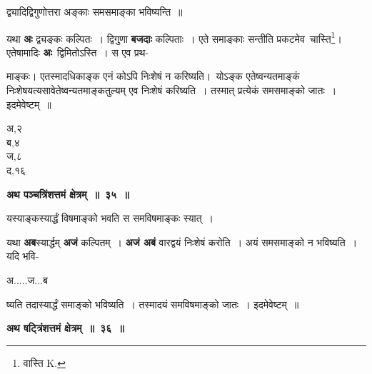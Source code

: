 \documentclass[11pt, openany]{book}
\begin{document}
 {\ab द्व्यादिद्विगुणोत्तरा अङ्काः समसमाङ्का भविष्यन्ति~॥ }

 यथा \textbf{अः} द्व्यङ्कः कल्पितः~। द्विगुणा \textbf{बजदाः} कल्पिताः~। एते  समाङ्काः सन्तीति प्रकटमेव \,चास्ति\renewcommand{\thefootnote}{१}\footnote{\hangindent=0.3in वास्ति {\en K.}}\;। एतेषामादिः \textbf{अः} \,द्विमितोऽस्ति~। स एव प्रथ-
\vspace{-4mm}

\begin{flushleft}
\begin{minipage}[t]{0.75\textwidth}
 माङ्कः\;। एतस्मादधिकाङ्क एनं कोऽपि निःशेषं न करिष्यति\;।~योऽङ्क एतेष्वन्यतमाङ्कं निःशेषयत्यसावेतेष्वन्यतमाङ्कतुल्यम् एव निःशेषं करिष्यति~। तस्मात् प्रत्येकं समसमाङ्को जातः~। इदमेवेष्टम्~॥
\end{minipage} 
\hfill
\begin{minipage}[t]{0.15\textwidth}
\vspace{-6mm}

अ,२\\
ब,४ \\
ज,८\\ 
द,१६
\end{minipage}
\end{flushleft}
\vspace{-1mm}

\begin{center}
\textbf{\large अथ पञ्चत्रिंशत्तमं क्षेत्रम्~॥~३५~॥ }
\end{center}

{\ab  यस्याङ्कस्यार्द्धं विषमाङ्को भवति स समविषमाङ्कः स्यात्~। }

\begin{flushleft}
\begin{minipage}[t]{0.7\textwidth}
\hspace{4mm} यथा \textbf{अब}स्यार्द्धम् \textbf{अजं} कल्पितम्~। \textbf{अजं अबं} वारद्वयं निःशेषं करोति~। अयं समसमाङ्को न  भविष्यति~। यदि  भवि-
\end{minipage} 
\hfill
\begin{minipage}[t]{0.2\textwidth}
 अ.....ज...ब 
\end{minipage}
\end{flushleft}
\vspace{-3mm}

\noindent ष्यति तदास्यार्द्धं समाङ्को भविष्यति~। तस्मादयं समविषमाङ्को जातः~। इदमेवेष्टम्~॥
\vspace{2mm}

\begin{center}
\textbf{\large अथ षट्त्रिंशत्तमं क्षेत्रम्~॥~३६~॥}
\end{center}
\end{document}
